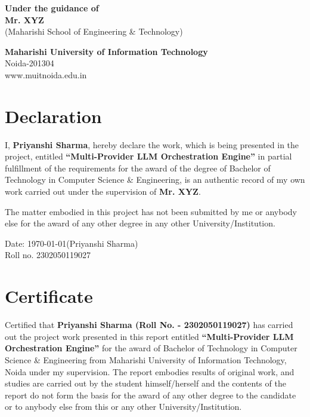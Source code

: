 \documentclass[12pt, a4paper]{report}
\begin{document}
\begin{titlepage}
\begin{singlespace}
        \begin{flushright}
            \textbf{Under the guidance of} \\
            \textbf{Mr. XYZ} \\
            (Maharishi School of Engineering \& Technology)
        \end{flushright}
        
        \vfill
        {\fontsize{12}{14.4}\selectfont \textbf{Maharishi University of Information Technology}} \\
        {\fontsize{12}{14.4}\selectfont Noida-201304} \\
        {\fontsize{12}{14.4}\selectfont www.muitnoida.edu.in} \\
        {\fontsize{12}{14.4}}
    \end{singlespace}
\end{titlepage}


\chapter*{Declaration}
I, \textbf{Priyanshi Sharma}, hereby declare the work, which is being presented in the project, entitled \textbf{“Multi-Provider LLM Orchestration Engine”} in partial fulfillment of the requirements for the award of the degree of Bachelor of Technology in Computer Science \& Engineering, is an authentic record of my own work carried out under the supervision of \textbf{Mr. XYZ}.

The matter embodied in this project has not been submitted by me or anybody else for the award of any other degree in any other University/Institution.

\vspace{2cm}
\noindent Date: \today \hfill (Priyanshi Sharma) \\
\indent \hfill Roll no. 2302050119027

\clearpage

\chapter*{Certificate}
Certified that \textbf{Priyanshi Sharma (Roll No. - 2302050119027)} has carried out the project work presented in this report entitled \textbf{“Multi-Provider LLM Orchestration Engine”} for the award of Bachelor of Technology in Computer Science \& Engineering from Maharishi University of Information Technology, Noida under my supervision. The report embodies results of original work, and studies are carried out by the student himself/herself and the contents of the report do not form the basis for the award of any other degree to the candidate or to anybody else from this or any other University/Institution.
\end{document}
